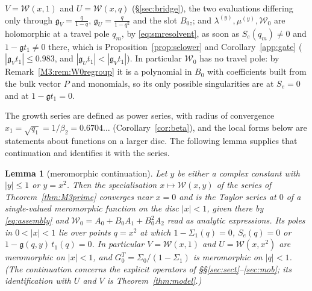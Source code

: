 \documentclass[11pt]{article}
\theoremstyle{plain}
\newtheorem{lemma}[theorem]{Lemma}
\theoremstyle{definition}
\theoremstyle{remark}
\begin{document}
$V=\mathcal W(x,1)$ and $U=\mathcal W(x,q)$ (\S\ref{sec:bridge}), the two evaluations differing
only through $\mathfrak g_V=\tfrac q{1-q}$, $\mathfrak g_U=\tfrac q{1-q^2}$ and the slot $B_{0z}$;
and $\lambda^{(y)},\mu^{(y)},\mathcal W_0$ are holomorphic at a travel pole $q_m$, by
\eqref{eq:smresolvent}, as soon as $S_e(q_m)\ne0$ and $1-\mathfrak gt_1\ne0$ there, which is
Proposition~\ref{prop:selower} and Corollary~\ref{app:gate} ($|\mathfrak g_Vt_1|\le0.983$, and
$|\mathfrak g_Ut_1|<|\mathfrak g_Vt_1|$). In particular $\mathcal W_0$ has no travel pole: by
Remark~\ref{M3:rem:W0regroup} it is a polynomial in $B_0$ with coefficients built from the bulk
vector $P$ and monomials, so its only possible singularities are at $S_e=0$ and at
$1-\mathfrak gt_1=0$.

The growth series are defined as power series, with radius of convergence
$x_1=\sqrt{q_1}=1/\beta_2=0.6704\ldots$ (Corollary~\ref{cor:beta}), and the local forms below are
statements about functions on a larger disc. The following lemma supplies that continuation and
identifies it with the series.

\begin{lemma}[meromorphic continuation]\label{lem:mero}
Let $y$ be either a complex constant with $|y|\le1$ or $y=x^2$. Then the specialisation
$x\mapsto\mathcal W(x,y)$ of the series of Theorem~\ref{thm:M3prime} converges near $x=0$ and is
the Taylor series at $0$ of a single-valued meromorphic function on the disc $|x|<1$, given there
by \eqref{eq:assembly} and $\mathcal W_0=A_0+B_0A_1+B_0^2A_2$ read as analytic expressions. Its
poles in $0<|x|<1$ lie over points $q=x^2$ at which $1-\Sigma_1(q)=0$, $S_e(q)=0$ or
$1-\mathfrak g(q,y)\,t_1(q)=0$. In particular $V=\mathcal W(x,1)$ and $U=\mathcal W(x,x^2)$ are
meromorphic on $|x|<1$, and $G^T_0=\Sigma_0/(1-\Sigma_1)$ is meromorphic on $|q|<1$.
\textup{(}The continuation concerns the explicit operators of \S\S\ref{sec:sect}--\ref{sec:mob}; its
identification with $U$ and $V$ is Theorem~\ref{thm:model}.\textup{)}
\end{lemma}
\end{document}
